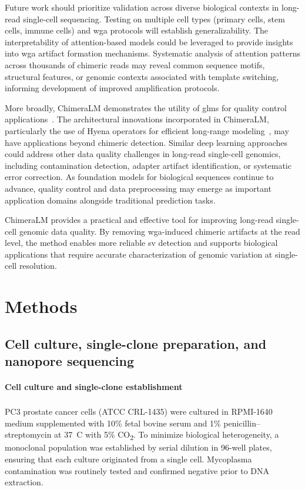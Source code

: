 \documentclass[pdflatex,sn-nature,lineno]{sn-jnl}%
\theoremstyle{thmstyleone}%
\theoremstyle{thmstyletwo}%
\theoremstyle{thmstylethree}%
\begin{document}
Future work should prioritize validation across diverse biological contexts in long-read single-cell sequencing. Testing on multiple cell types (primary cells, stem cells, immune cells) and \gls{wga} protocols will establish generalizability.
The interpretability of attention-based models could be leveraged to provide insights into \gls{wga} artifact formation mechanisms.
Systematic analysis of attention patterns across thousands of chimeric reads may reveal common sequence motifs, structural features, or genomic contexts associated with template switching, informing development of improved amplification protocols.

More broadly, ChimeraLM demonstrates the utility of \glspl{glm} for quality control applications~\cite{nguyen2023hyenadna}.
The architectural innovations incorporated in ChimeraLM, particularly the use of Hyena operators for efficient long-range modeling~\cite{Poli2023HyenaHT}, may have applications beyond chimeric detection.
Similar deep learning approaches could address other data quality challenges in long-read single-cell genomics, including contamination detection, adapter artifact identification, or systematic error correction.
As foundation models for biological sequences continue to advance, quality control and data preprocessing may emerge as important application domains alongside traditional prediction tasks.

ChimeraLM provides a practical and effective tool for improving long-read single-cell genomic data quality.
By removing \gls{wga}-induced chimeric artifacts at the read level, the method enables more reliable \gls{sv} detection and supports biological applications that require accurate characterization of genomic variation at single-cell resolution.

\section*{Methods}\label{sec:methods}

\subsection*{Cell culture, single-clone preparation, and nanopore sequencing}

\paragraph{Cell culture and single-clone establishment}
PC3 prostate cancer cells (ATCC\textsuperscript{\textregistered} CRL-1435\texttrademark) were cultured in RPMI-1640 medium supplemented with 10\% fetal bovine serum and 1\% penicillin--streptomycin at 37~\textdegree C with 5\% CO\textsubscript{2}. To minimize biological heterogeneity, a monoclonal population was established by serial dilution in 96-well plates, ensuring that each culture originated from a single cell. Mycoplasma contamination was routinely tested and confirmed negative prior to DNA extraction.
\end{document}

